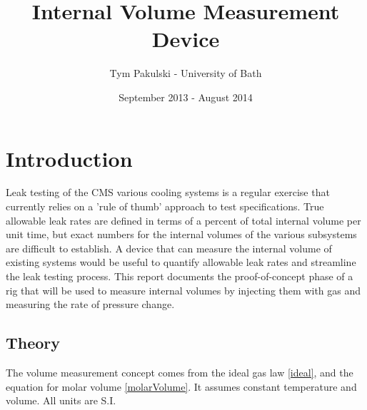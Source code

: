 \documentclass{report}
\author{Tym Pakulski - University of Bath}
\title{Internal Volume Measurement Device}
\date{September 2013 - August 2014}
\begin{document}
\graphicspath{{./images/}}
\maketitle
\tableofcontents
\section{Introduction}
Leak testing of the CMS various cooling systems is a regular exercise that currently relies on a 'rule of thumb' approach to test specifications. True allowable leak rates are defined in terms of a percent of total internal volume per unit time, but exact numbers for the internal volumes of the various subsystems are difficult to establish. A device that can measure the internal volume of existing systems would be useful to quantify allowable leak rates and streamline the leak testing process.
This report documents the proof-of-concept phase of a rig that will be used to measure internal volumes by injecting them with gas and measuring the rate of pressure change. 
\subsection{Theory}
The volume measurement concept comes from the ideal gas law \eqref{ideal}, and the equation for molar volume \eqref{molarVolume}. It assumes constant temperature and volume. All units are S.I.
\end{document}
